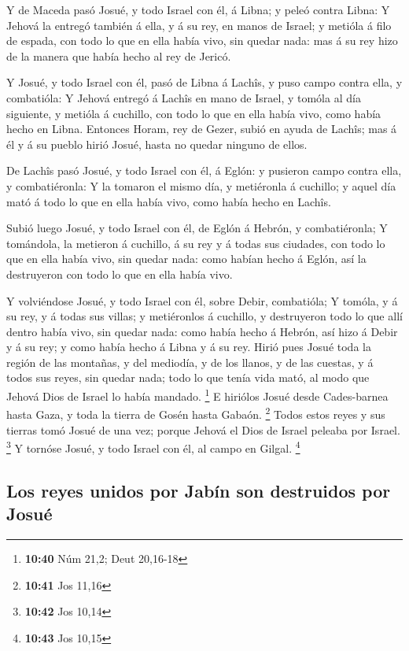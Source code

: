  Y de Maceda pasó Josué, y todo Israel con él, á Libna; y
peleó contra Libna:  Y Jehová la entregó también á ella, y
á su rey, en manos de Israel; y metióla á filo de espada, con todo lo
que en ella había vivo, sin quedar nada: mas á su rey hizo de la manera
que había hecho al rey de Jericó.

 Y Josué, y todo Israel con él, pasó de Libna á Lachîs, y
puso campo contra ella, y combatióla:  Y Jehová entregó á
Lachîs en mano de Israel, y tomóla al día siguiente, y metióla á
cuchillo, con todo lo que en ella había vivo, como había hecho en Libna.
 Entonces Horam, rey de Gezer, subió en ayuda de Lachîs;
mas á él y á su pueblo hirió Josué, hasta no quedar ninguno de ellos.

 De Lachîs pasó Josué, y todo Israel con él, á Eglón: y
pusieron campo contra ella, y combatiéronla:  Y la tomaron
el mismo día, y metiéronla á cuchillo; y aquel día mató á todo lo que en
ella había vivo, como había hecho en Lachîs.

 Subió luego Josué, y todo Israel con él, de Eglón á
Hebrón, y combatiéronla;  Y tomándola, la metieron á
cuchillo, á su rey y á todas sus ciudades, con todo lo que en ella había
vivo, sin quedar nada: como habían hecho á Eglón, así la destruyeron con
todo lo que en ella había vivo.

 Y volviéndose Josué, y todo Israel con él, sobre Debir,
combatióla;  Y tomóla, y á su rey, y á todas sus villas; y
metiéronlos á cuchillo, y destruyeron todo lo que allí dentro había
vivo, sin quedar nada: como había hecho á Hebrón, así hizo á Debir y á
su rey; y como había hecho á Libna y á su rey.  Hirió pues
Josué toda la región de las montañas, y del mediodía, y de los llanos, y
de las cuestas, y á todos sus reyes, sin quedar nada; todo lo que tenía
vida mató, al modo que Jehová Dios de Israel lo había mandado.
\footnote{\textbf{10:40} Núm 21,2; Deut 20,16-18}  E
hiriólos Josué desde Cades-barnea hasta Gaza, y toda la tierra de Gosén
hasta Gabaón. \footnote{\textbf{10:41} Jos 11,16}  Todos
estos reyes y sus tierras tomó Josué de una vez; porque Jehová el Dios
de Israel peleaba por Israel. \footnote{\textbf{10:42} Jos 10,14}
 Y tornóse Josué, y todo Israel con él, al campo en Gilgal.
\footnote{\textbf{10:43} Jos 10,15}

\hypertarget{los-reyes-unidos-por-jabuxedn-son-destruidos-por-josuuxe9}{%
\subsection{Los reyes unidos por Jabín son destruidos por
Josué}\label{los-reyes-unidos-por-jabuxedn-son-destruidos-por-josuuxe9}}

